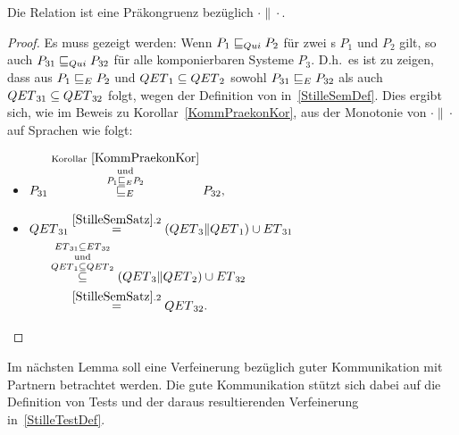 \begin{Kor}
  \label{StillePraekonKor}
  Die Relation \QRel{} ist eine Präkongruenz bezüglich $\cdot\|\cdot$.
\end{Kor}
\begin{proof}
  Es muss gezeigt werden: Wenn $P_1 \sqsubseteq  _{Qui} P_2$ für zwei \MEIO{}s $P_1$ und $P_2$
  gilt, so auch $P_{31} \sqsubseteq  _{Qui} P_{32}$ für alle komponierbaren Systeme
  $P_3$. D.h.\ es ist zu zeigen, dass aus $P_1 \sqsubseteq  _E P_2$ und $QET{}_1\subseteq
  QET{}_2$ sowohl $P_{31} \sqsubseteq  _E P_{32}$ als auch $QET{}_{31}\subseteq
  QET{}_{32}$ folgt, wegen der Definition von \QRel{} in~\ref{StilleSemDef}.
  Dies ergibt sich, wie im Beweis zu Korollar~\ref{KommPraekonKor}, aus der
  Monotonie von $\cdot\|\cdot$ auf Sprachen wie folgt:
  \begin{itemize}
    \item $\begin{aligned}[t]
        P_{31} \overset{\mathrm{Korollar}~\ref{KommPraekonKor}}{
          \overset{\mathrm{und}}{\overset{P_1 \sqsubseteq  _E P_2}{ \sqsubseteq  _E}}}
        P_{32},
    \end{aligned}$
    \item $\begin{aligned}[t]
        \QET{}_{31} &\overset{\ref{StilleSemSatz}.2}{=}
        (\QET{}_3\|\QET{}_1)\cup \ET{}_{31}\\
        &\hspace{-0.6cm}\overset{\ET{}_{31}\subseteq
      \ET{}_{32}}{\overset{\mathrm{und}}{\overset{\QET{}_1\subseteq
      \QET{}_2}{\subseteq}}} (\QET{}_3\|\QET{}_2) \cup \ET{}_{32}\\
        &\overset{\ref{StilleSemSatz}.2}{=} \QET{}_{32}.
    \end{aligned}$
  \vspace*{-0.7cm}
  \end{itemize}
\end{proof}

Im nächsten Lemma soll eine Verfeinerung bezüglich guter Kommunikation mit
Partnern betrachtet werden. Die gute Kommunikation stützt sich dabei auf die
Definition von Tests und der daraus resultierenden Verfeinerung
in~\ref{StilleTestDef}.

